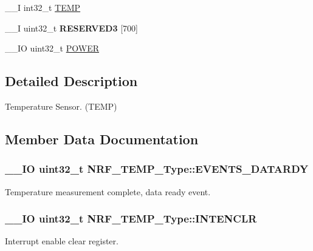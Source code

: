 \begin{DoxyCompactItemize}
\item 
\+\_\+\+\_\+\+I int32\+\_\+t \hyperlink{struct_n_r_f___t_e_m_p___type_a0991e2e212f4a7151d2d27144c31f02d}{T\+E\+M\+P}
\item 
\hypertarget{struct_n_r_f___t_e_m_p___type_aaa468085ad1953e2ba31a274445b4d31}{}\+\_\+\+\_\+\+I uint32\+\_\+t {\bfseries R\+E\+S\+E\+R\+V\+E\+D3} \mbox{[}700\mbox{]}\label{struct_n_r_f___t_e_m_p___type_aaa468085ad1953e2ba31a274445b4d31}

\item 
\+\_\+\+\_\+\+I\+O uint32\+\_\+t \hyperlink{struct_n_r_f___t_e_m_p___type_af4f4e7ef9bede1f8602247c2fa0f4cd8}{P\+O\+W\+E\+R}
\end{DoxyCompactItemize}


\subsection{Detailed Description}
Temperature Sensor. (T\+E\+M\+P) 

\subsection{Member Data Documentation}
\hypertarget{struct_n_r_f___t_e_m_p___type_a17e996b021410ca911c0dac530297618}{}
\subsubsection[{E\+V\+E\+N\+T\+S\+\_\+\+D\+A\+T\+A\+R\+D\+Y}]{\setlength{\rightskip}{0pt plus 5cm}\+\_\+\+\_\+\+I\+O uint32\+\_\+t N\+R\+F\+\_\+\+T\+E\+M\+P\+\_\+\+Type\+::\+E\+V\+E\+N\+T\+S\+\_\+\+D\+A\+T\+A\+R\+D\+Y}\label{struct_n_r_f___t_e_m_p___type_a17e996b021410ca911c0dac530297618}
Temperature measurement complete, data ready event. \hypertarget{struct_n_r_f___t_e_m_p___type_a6e21761bc105f3ff5834c55097c7b130}{}
\subsubsection[{I\+N\+T\+E\+N\+C\+L\+R}]{\setlength{\rightskip}{0pt plus 5cm}\+\_\+\+\_\+\+I\+O uint32\+\_\+t N\+R\+F\+\_\+\+T\+E\+M\+P\+\_\+\+Type\+::\+I\+N\+T\+E\+N\+C\+L\+R}\label{struct_n_r_f___t_e_m_p___type_a6e21761bc105f3ff5834c55097c7b130}
Interrupt enable clear register. \hypertarget{struct_n_r_f___t_e_m_p___type_aee53e0bad0d07665902ff486ef9a86a2}{}
